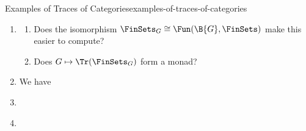 \begin{example}{Examples of Traces of Categories}{examples-of-traces-of-categories}
\begin{enumerate}
\begin{itemize}
                    \[
                        \Im^{\infty}(f)%
                        \defeq%
                        \bigcap^{\infty}_{n=1}f^{\circ n}(X),%
                    \]%
                    which will be a finite set of size $n$.
                \item Consider the map of finite sets
                    \[
                        \restriction{f}{\Im^{\infty}(f)}%
                        \colon%
                        \Im^{\infty}(f)%
                        \to%
                        \Im^{\infty}(f),%
                    \]%
                    which is a bijection.
                \item Take the conjugacy class $\sigma$ of $\restriction{f}{\Im^{\infty}(f)}$ in $\Sigma_{n}$.
                \item The pair $(n,\sigma)$ then gives an element of $\Tr(\FinSets)$ (under the identification $\Tr(\FinSets)\cong\coprod^{\infty}_{n=0}\Cl(\Sigma_{n})$).
            \end{itemize}
        \item\label{examples-of-traces-of-categories-the-trace-of-the-category-of-sets}
            \begin{enumerate}
                \item Does the isomorphism $\FinSets_{G}\cong\Fun(\B{G},\FinSets)$ make this easier to compute?
                \item Does $G\mapsto\Tr(\FinSets_{G})$ form a monad?
            \end{enumerate}
        \item\label{examples-of-traces-of-categories-the-trace-of-the-category-of-sets}We have
        \item\label{examples-of-traces-of-categories-the-trace-of-the-category-of-groups}
        \item\label{examples-of-traces-of-categories-the-trace-of-the-category-of-abelian-groups}
    \end{enumerate}
\end{example}
